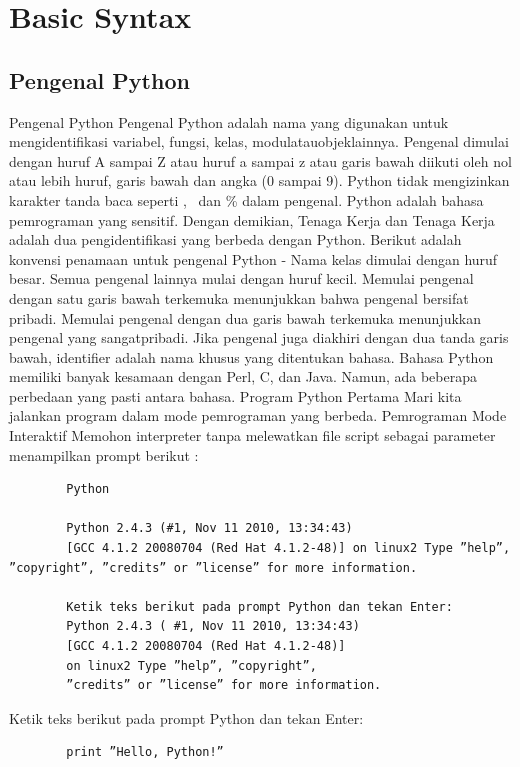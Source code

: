 


\section{Basic Syntax}
\subsection{Pengenal Python}
Pengenal Python Pengenal Python adalah nama yang digunakan untuk mengidentiﬁkasi variabel, fungsi, kelas, modulatauobjeklainnya. Pengenal dimulai dengan huruf A sampai Z atau huruf a sampai z atau garis bawah  diikuti oleh nol atau lebih huruf, garis bawah dan angka (0 sampai 9). Python tidak mengizinkan karakter tanda baca seperti \@, \, dan \% dalam pengenal. Python adalah bahasa pemrograman yang sensitif. Dengan demikian, Tenaga Kerja dan Tenaga Kerja adalah dua pengidentiﬁkasi yang berbeda dengan Python. Berikut adalah konvensi penamaan untuk pengenal Python - Nama kelas dimulai dengan huruf besar. Semua pengenal lainnya mulai dengan huruf kecil. Memulai pengenal dengan satu garis bawah terkemuka menunjukkan bahwa pengenal bersifat pribadi. Memulai pengenal dengan dua garis bawah terkemuka menunjukkan pengenal yang sangatpribadi. Jika pengenal juga diakhiri dengan dua tanda garis bawah, identiﬁer adalah nama khusus yang ditentukan bahasa. 
Bahasa Python memiliki banyak kesamaan dengan Perl, C, dan Java. Namun, ada beberapa perbedaan yang pasti antara bahasa. Program Python Pertama Mari kita jalankan program dalam mode pemrograman yang berbeda. Pemrograman Mode Interaktif Memohon interpreter tanpa melewatkan ﬁle script sebagai parameter menampilkan prompt berikut :
	\begin{verbatim}
		Python

		Python 2.4.3 (#1, Nov 11 2010, 13:34:43) 
		[GCC 4.1.2 20080704 (Red Hat 4.1.2-48)] on linux2 Type ”help”, ”copyright”, ”credits” or ”license” for more information.
		
		Ketik teks berikut pada prompt Python dan tekan Enter:
		Python 2.4.3 ( #1, Nov 11 2010, 13:34:43) 
		[GCC 4.1.2 20080704 (Red Hat 4.1.2-48)] 
		on linux2 Type ”help”, ”copyright”, 
		”credits” or ”license” for more information.
	\end{verbatim}
		Ketik teks berikut pada prompt Python dan 
		tekan Enter:

	\begin{verbatim}	
		print ”Hello, Python!”
	\end{verbatim}

